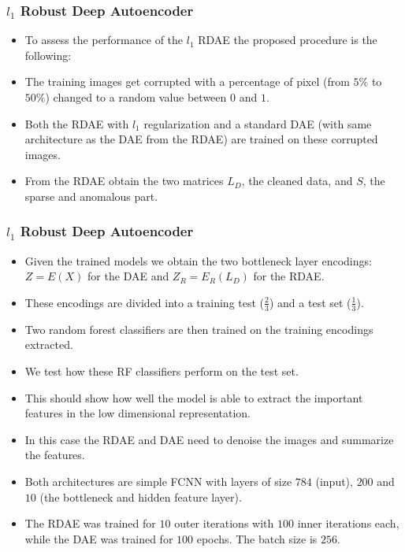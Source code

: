 \documentclass{beamer}
\theoremstyle{plain}
\theoremstyle{definition}
\theoremstyle{remark}
\begin{document}
\begin{frame}
	\frametitle{$l_1$ Robust Deep Autoencoder}
	\begin{itemize}
		\item To assess the performance of the $l_1$ RDAE the proposed procedure is the following:
		\item The training images get corrupted with a percentage of pixel (from $5\%$ to $50\%$) changed to a random value between $0$ and $1$.
		\item Both the RDAE with $l_1$ regularization and a standard DAE (with same architecture as the DAE from the RDAE) are trained on these corrupted images.
		\item From the RDAE obtain the two matrices $L_D$, the cleaned data, and $S$, the sparse and anomalous part.
	\end{itemize}
\end{frame}

\begin{frame}
	\frametitle{$l_1$ Robust Deep Autoencoder}
	\begin{itemize}
		\item Given the trained models we obtain the two bottleneck layer encodings: $Z = E(X)$ for the DAE and $Z_R=E_R(L_D)$ for the RDAE.
		\item These encodings are divided into a training test ($\frac{2}{3}$) and a test set ($\frac{1}{3}$).
		\item Two random forest classifiers are then trained on the training encodings extracted.
		\item We test how these RF classifiers perform on the test set.
	\end{itemize}
\end{frame}

\begin{frame}
	\begin{itemize}
		\item This should show how well the model is able to extract the important features in the low dimensional representation.
		\item In this case the RDAE and DAE need to denoise the images and summarize the features.
		\item Both architectures are simple FCNN with layers of size $784$ (input), $200$ and $10$ (the bottleneck and hidden feature layer).
		\item The RDAE was trained for $10$ outer iterations with $100$ inner iterations each, while the DAE was trained for $100$ epochs. The batch size is $256$.
	\end{itemize}
\end{frame}
\end{document}
